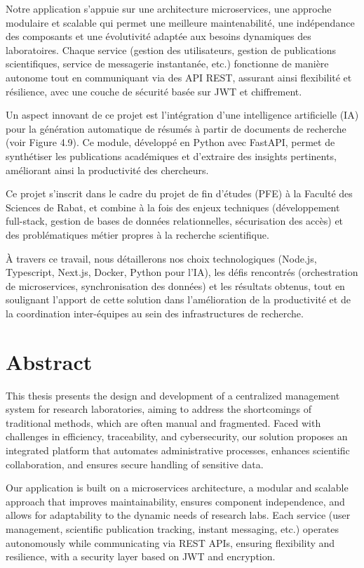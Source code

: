 \documentclass[12pt]{rapportPfe}
\begin{document}
Notre application s’appuie sur une architecture microservices, une approche modulaire et scalable qui permet une meilleure maintenabilité, une indépendance des composants et une évolutivité adaptée aux besoins dynamiques des laboratoires. Chaque service (gestion des utilisateurs, gestion de publications scientifiques, service de messagerie instantanée, etc.) fonctionne de manière autonome tout en communiquant via des API REST, assurant ainsi flexibilité et résilience, avec une couche de sécurité basée sur JWT et chiffrement.

Un aspect innovant de ce projet est l'intégration d'une intelligence artificielle (IA) pour la génération automatique de résumés à partir de documents de recherche (voir Figure 4.9). Ce module, développé en Python avec FastAPI, permet de synthétiser les publications académiques et d'extraire des insights pertinents, améliorant ainsi la productivité des chercheurs.

Ce projet s’inscrit dans le cadre du projet de fin d’études (PFE) à la Faculté des Sciences de Rabat, et combine à la fois des enjeux techniques (développement full-stack, gestion de bases de données relationnelles, sécurisation des accès) et des problématiques métier propres à la recherche scientifique.

À travers ce travail, nous détaillerons nos choix technologiques (Node.js, Typescript, Next.js, Docker, Python pour l'IA), les défis rencontrés (orchestration de microservices, synchronisation des données) et les résultats obtenus, tout en soulignant l’apport de cette solution dans l’amélioration de la productivité et de la coordination inter-équipes au sein des infrastructures de recherche.

\chapter*{Abstract}
This thesis presents the design and development of a centralized management system for research laboratories, aiming to address the shortcomings of traditional methods, which are often manual and fragmented. Faced with challenges in efficiency, traceability, and cybersecurity, our solution proposes an integrated platform that automates administrative processes, enhances scientific collaboration, and ensures secure handling of sensitive data.

Our application is built on a microservices architecture, a modular and scalable approach that improves maintainability, ensures component independence, and allows for adaptability to the dynamic needs of research labs. Each service (user management, scientific publication tracking, instant messaging, etc.) operates autonomously while communicating via REST APIs, ensuring flexibility and resilience, with a security layer based on JWT and encryption.
\end{document}
